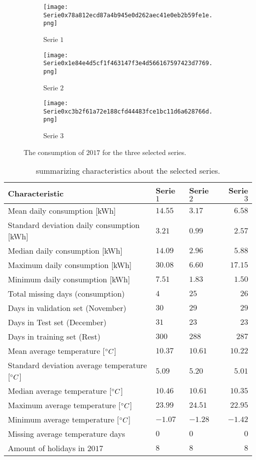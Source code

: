 \begin{figure}[ht]
	\begin{subfigure}{0.32\textwidth}
		\texttt{[image: Serie0x78a812ecd87a4b945e0d262aec41e0eb2b59fe1e.png]}
		\caption{Serie $ 1 $}
	\end{subfigure}	 	
	\begin{subfigure}{0.32\textwidth}
		\texttt{[image: Serie0x1e84e4d5cf1f463147f3e4d566167597423d7769.png]}
		\caption{Serie $ 2 $}
	\end{subfigure}	
	\begin{subfigure}{0.32\textwidth}
		\texttt{[image: Serie0xc3b2f61a72e188cfd44483fce1bc11d6a628766d.png]}
		\caption{Serie $ 3 $}
	\end{subfigure}
	\caption{The consumption of $ 2017 $ for the three selected series. }
\end{figure}

\begin{table}
  \centering
  \begin{tabular}{@{}l|llr@{}} \toprule
  	\textbf{Characteristic}	& \textbf{Serie $ 1 $} & \textbf{Serie $ 2 $} & \textbf{Serie $ 3 $}\\\midrule
    Mean daily consumption [kWh]& $ 14.55 $&$ 3.17 $  & $ 6.58 $ \\
    Standard deviation daily consumption [kWh] &$ 3.21 $ & $ 0.99 $& $ 2.57 $ \\
    Median daily consumption [kWh] & $ 14.09 $ & $ 2.96 $& $ 5.88 $ \\
    Maximum daily consumption [kWh] & $ 30.08 $ & $ 6.60 $ &  $ 17.15 $   \\
    Minimum daily consumption [kWh]& $ 7.51 $ & $ 1.83 $ &  $ 1.50 $   \\
    Total missing days (consumption) & $ 4 $ &$ 25 $ & $ 26 $\\
    Days in validation set (November)&  $ 30 $ & $ 29 $  & $ 29 $ \\
    Days in Test set (December) & $ 31 $    &    $ 23 $  & $ 23 $ \\
    Days in training set (Rest)&   $ 300 $  &  $ 288 $   &  $ 287 $\\
    Mean average temperature [$\degree C$]& $ 10.37 $  &  $ 10.61 $  & $ 10.22 $ \\
    Standard deviation average temperature [$\degree C$]& $ 5.09 $  & $ 5.20 $   & $ 5.01 $ \\
    Median average temperature [$\degree C$] &  $ 10.46 $ &  $ 10.61 $  & $ 10.35 $ \\
    Maximum average temperature [$\degree C$] & $ 23.99 $  & $ 24.51 $   & $ 22.95 $ \\ 
    Minimum average temperature [$\degree C$] & $ -1.07 $  &  $ -1.28 $  & $ -1.42 $ \\
    Missing average temperature days &  $ 0 $ & $ 0 $  & $ 0 $  \\ 
    Amount of holidays in $ 2017 $ & $ 8 $  &  $ 8 $  & $ 8 $ \\\bottomrule
  \end{tabular}
  \caption{summarizing characteristics about the selected series.}
  \label{tab:summ_data}
\end{table}


